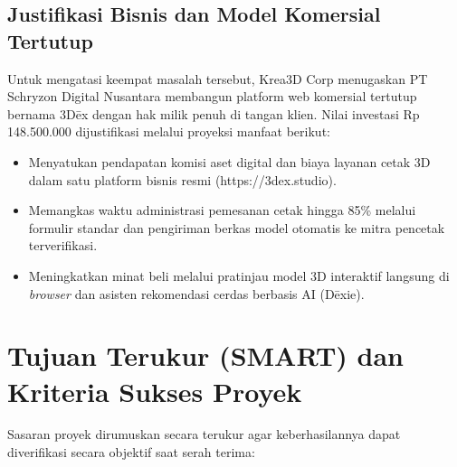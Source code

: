 \documentclass[11pt,a4paper]{article}
\begin{document}
\subsection{Justifikasi Bisnis dan Model Komersial Tertutup}
Untuk mengatasi keempat masalah tersebut, Krea3D Corp menugaskan PT Schryzon Digital Nusantara membangun platform web komersial tertutup bernama 3D\={e}x dengan hak milik penuh di tangan klien. Nilai investasi Rp 148.500.000 dijustifikasi melalui proyeksi manfaat berikut:
\begin{itemize}[leftmargin=1.5em, itemsep=2pt]
    \item Menyatukan pendapatan komisi aset digital dan biaya layanan cetak 3D dalam satu platform bisnis resmi (https://3dex.studio).
    \item Memangkas waktu administrasi pemesanan cetak hingga 85\% melalui formulir standar dan pengiriman berkas model otomatis ke mitra pencetak terverifikasi.
    \item Meningkatkan minat beli melalui pratinjau model 3D interaktif langsung di \textit{browser} dan asisten rekomendasi cerdas berbasis AI (D\={e}xie).
\end{itemize}

\section{Tujuan Terukur (SMART) dan Kriteria Sukses Proyek}

Sasaran proyek dirumuskan secara terukur agar keberhasilannya dapat diverifikasi secara objektif saat serah terima:
\end{document}
